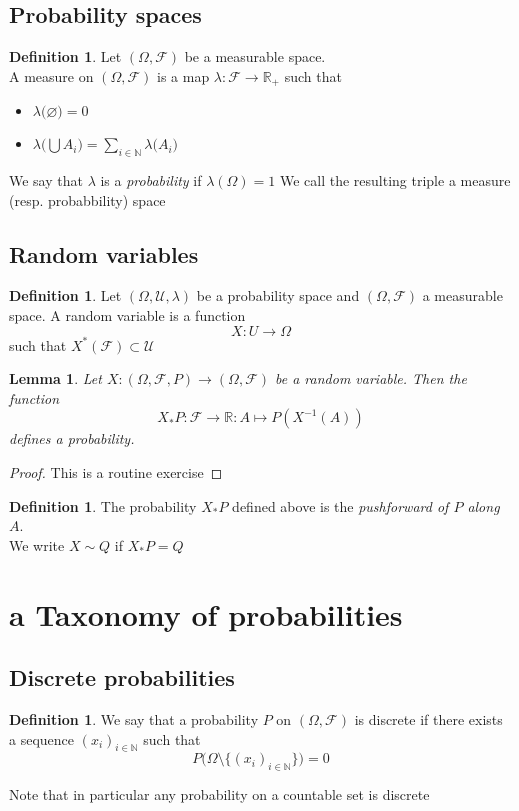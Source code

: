 \documentclass{book}
\theoremstyle{plain}
\newtheorem{lemma}[corollary]{Lemma}
\theoremstyle{definition}
\newtheorem{definition}[corollary]{Definition}
\renewcommand{\d}[1]{\mathbb{#1}}
\newcommand{\fun}{\mapsto}
\newcommand{\mor}{\longrightarrow}
\renewcommand{\r}[1]{\mathcal{#1}}
\begin{document}
\subsection{Probability spaces}
\begin{definition}
Let $(\Omega,\r{F})$ be a measurable space.\\
A measure on $(\Omega,\r{F})$ is a map $\lambda:\r{F}\mor \d{R}_+$ such that 
\begin{itemize}
\item $\lambda\big(\varnothing) = 0$
\item $\lambda\big(\bigcup A_i\big) = \sum_{i \in \d{N}} \lambda\big(A_i\big)$
\end{itemize}
We say that $\lambda$ is a \emph{probability} if $\lambda(\Omega)=1$
We call the resulting triple a measure (resp. probabbility) space


\end{definition}

\subsection{Random variables}
\begin{definition}
Let $(\Omega, \r{U}, \lambda)$ be a probability space and $(\Omega, \r{F})$ a measurable space. A random variable is a function
\[
X: U\mor \Omega
\]
such that $X^*(\r{F})\subset \r{U}$
\end{definition}
\begin{lemma}
Let $X: (\Omega, \r{F}, P)\mor (\Omega, \r{F})$ be a random variable. Then the function
\[
X_*P: \r{F}\mor \d{R}:  A\fun P(X^{-1}(A)) 
\]
defines a probability.
\end{lemma}
\begin{proof}
This is a routine exercise
\end{proof}
\begin{definition}
The probability $X_*P$ defined above is the \emph{pushforward of $P$ along $A$}.\\
We write $X\sim Q$ if $X_*P =Q$
\end{definition}
\section{a Taxonomy of probabilities}
\subsection{Discrete probabilities}
\begin{definition}
We say that a probability $P$ on $(\Omega,\r{F})$ is discrete if there exists a sequence $(x_i)_{i \in \d{N}}$ such that
\[
P\big(\Omega\setminus\{(x_i)_{i \in \d{N}}\}\big)=0
\]
\end{definition}
Note that in particular any probability on a countable set is discrete
\end{document}
